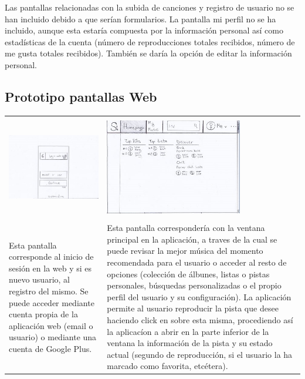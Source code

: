 \vspace{1cm}
Las pantallas relacionadas con la subida de canciones y registro de usuario no se han incluido debido a que serían formularios.
La pantalla mi perfil no se ha incluido, aunque esta estaría compuesta por la información personal así como estadísticas de la cuenta (número de reproducciones totales recibidos, número de me gusta totales recibidos). También se daría la opción de editar la información personal.

\subsection{Prototipo pantallas Web}

\begin{tabular}{ p{6cm} p{6cm}}
	\hline
	\\
	\includegraphics[width=6cm]{Figures/web/Login-web.png}
	&
	\includegraphics[width=6cm]{Figures/web/Lista-web.png} \\
	\hline
	\\
	Esta pantalla corresponde al inicio de sesión en la web y si es nuevo usuario, al registro del mismo.
	Se puede acceder mediante cuenta propia de la aplicación web (email o usuario) o mediante una cuenta de Google Plus.
	&
	Esta pantalla correspondería con la ventana principal en la aplicación, a traves de la cual se puede revisar la mejor música del momento recomendada para el usuario o acceder al resto de opciones (colección de álbunes, listas o pistas personales, búsquedas personalizadas o el propio perfil del usuario y su configuración).
	La aplicación permite al usuario reproducir la pista que desee haciendo click en sobre esta misma, procediendo así la aplicacíon a abrir en la parte inferior de la ventana la información de la pista y su estado actual (segundo de reproducción, si el usuario la ha marcado como favorita, etcétera).
	\\
	\hline
\end{tabular}


